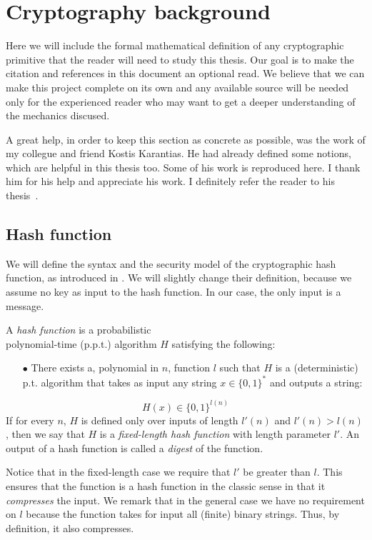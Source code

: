 \section{Cryptography background} \label{ch:math}
%
Here we will include the formal mathematical definition of any cryptographic primitive that the reader will need to study this thesis. Our goal is to make the citation and references in this document an optional read. We believe that we can make this project complete on its own and any available source will be needed only for the experienced reader who may want to get a deeper understanding of the mechanics discused.

A great help, in order to keep this section as concrete as possible, was the work of my collegue and friend Kostis Karantias. He had already defined some notions, which are helpful in this thesis too. Some of his work is reproduced here. I thank him for his help and appreciate his work. I definitely refer the reader to his thesis~\cite{gtklocker}.
%
\subsection{Hash function}
%
We will define the syntax and the security model of the cryptographic hash function, as introduced in \cite{Katz:2007:IMC:1206501}. We will slightly change their definition, because we assume no key as input to the hash function. In our case, the only input is a message.
%
\begin{definition}
A \emph{hash function} is a probabilistic \\
polynomial-time (p.p.t.) algorithm $H$ satisfying the following:
\begin{itemize}
  \item[$\bullet$] There exists a, polynomial in $n$, function $l$ such that $H$ is a (deterministic) p.t. algorithm that takes as input any string $x \in { \{ 0,1 \}}^*$ and outputs a string:
\end{itemize}
\begin{equation} \nonumber
  H(x) \in { \{ 0,1 \}}^{l(n)}
\end{equation}
If for every $n$, $H$ is defined only over inputs of length $l'(n)$ and $l'(n) > l(n)$, then
we say that $H$ is a \emph{fixed-length hash function} with length parameter $l'$. An output of a hash function is called a \emph{digest} of the function.
\end{definition}

Notice that in the fixed-length case we require that $l'$ be greater than $l$. This ensures that the
function is a hash function in the classic sense in that it \emph{compresses} the input. We remark
that in the general case we have no requirement on $l$ because the function takes for input all (finite) binary strings. Thus, by definition, it also compresses.

